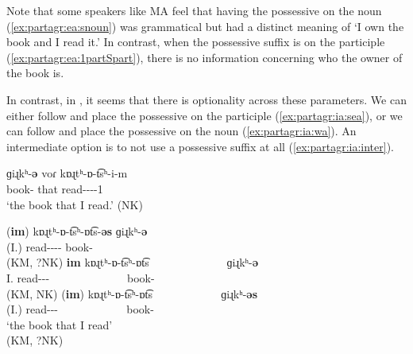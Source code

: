 Note that some speakers like MA feel that having the possessive on the noun (\ref{ex:partagr:ea:snoun}) was grammatical but had a distinct meaning of `I own the book and I read it.'  In contrast, when the possessive suffix is on the participle (\ref{ex:partagr:ea:1partSpart}), there is no information concerning who the owner of the book is. 



In contrast, in {\iaIA}, it seems that there is optionality across these parameters. We can either follow {\seaAbbre} and   place the possessive on the participle (\ref{ex:partagr:ia:sea}), or we can follow {\swaAbbre} and place the possessive on the noun (\ref{ex:partagr:ia:wa}).  An intermediate option is to not use a possessive suffix at all (\ref{ex:partagr:ia:inter}). 

\begin{exe}
	\ex {{\iaIA}}
	\begin{xlist}
		\ex \gll     ɡiɻkʰ-\textbf{ǝ}  voɾ kɒɻtʰ-ɒ-t͡sʰ-i-m\\
		book-{}  that  read-{\thgloss}-{\aorperf}-{\pst}-1{\sg} \\
		\trans `the book that I read.' \label{ex:partagr:ia:1full} \hfill (NK)  \\
		
		\ex \gll   (\textbf{im}) kɒɻtʰ-ɒ-t͡sʰ-ɒt͡s-\textbf{ǝs}    ɡiɻkʰ-\textbf{ǝ}   \\
		(I.{\gen}) read-{\thgloss}-{\aorother}-{\rptcp}-{\possFsg} book-{} \\
		\trans {} \label{ex:partagr:ia:sea}  \hfill (KM, ?NK)
		\ex \gll  \textbf{im} kɒɻtʰ-ɒ-t͡sʰ-ɒt͡s  ~ ~  ~  ~   ~ ~    ~ ~   ɡiɻkʰ-\textbf{ǝ} \\
		I.{\gen} read-{\thgloss}-{\aorother}-{\rptcp}  ~ ~ ~   ~  ~ ~  ~   ~ book-{} \\
		\trans {} \label{ex:partagr:ia:inter} \hfill (KM, NK)
		\ex \gll (\textbf{im})  kɒɻtʰ-ɒ-t͡sʰ-ɒt͡s ~ ~  ~    ~  ~ ~   ~    ɡiɻkʰ-\textbf{ǝs} \\
		(I.{\gen})  read-{\thgloss}-{\aorother}-{\rptcp}  ~ ~    ~ ~  ~ ~  ~  book-{\possFsg} \\
		\trans  `the book that I read'
		\\
		 \label{ex:partagr:ia:wa} \hfill (KM, ?NK) \\
		
	\end{xlist}
\end{exe}

